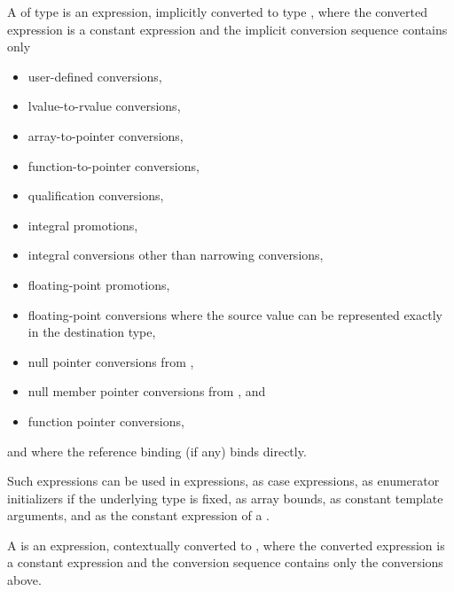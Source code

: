 \pnum
A 
of type  is an
expression, implicitly converted to type , where
the converted expression is a constant expression and the
implicit conversion sequence contains only
\begin{itemize}
\item user-defined conversions,
\item lvalue-to-rvalue conversions,
\item array-to-pointer conversions,
\item function-to-pointer conversions,
\item qualification conversions,
\item integral promotions,
\item integral conversions other than narrowing conversions,
\item floating-point promotions,
\item floating-point conversions where
  the source value can be represented exactly in the destination type,
\item null pointer conversions from ,
\item null member pointer conversions from , and
\item function pointer conversions,
\end{itemize}
and where the reference binding (if any) binds directly.
\begin{note}
Such expressions can be used in 
expressions, as case expressions,
as enumerator initializers if the underlying type is
fixed, as array bounds,
as constant template arguments,
and as the constant expression of a .
\end{note}
%
%
A  is
an expression, contextually converted to ,
where the converted expression is a constant expression and
the conversion sequence contains only the conversions above.

